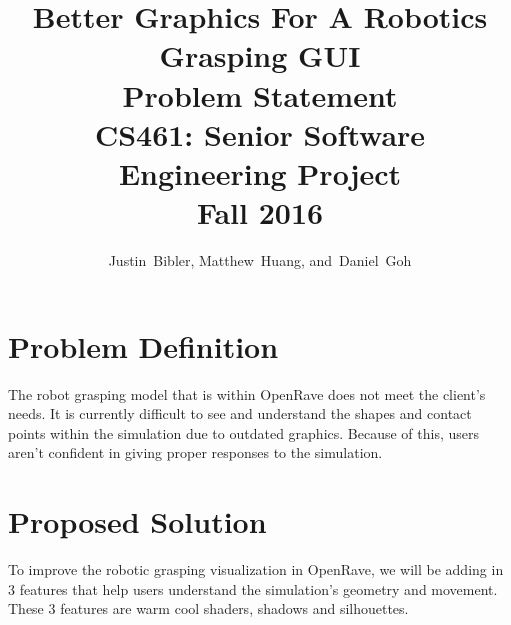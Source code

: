 \documentclass[10pt,journal,compsoc]{IEEEtran}
\begin{document}
\onecolumn
\begin{titlepage}
\title{Better Graphics For A Robotics Grasping GUI\\ Problem Statement \\  [0.5em] 
	\large CS461: Senior Software Engineering Project \\ Fall 2016}

\author{Justin~Bibler,
        Matthew~Huang,
        and~Daniel~Goh}
		

\maketitle

\end{titlepage}

\section{Problem Definition}
The robot grasping model that is within OpenRave does not meet the client’s needs.
It is currently difficult to see and understand the shapes and contact points within the simulation due to outdated graphics.
Because of this, users aren’t confident in giving proper responses to the simulation.

\section{Proposed Solution}
To improve the robotic grasping visualization in OpenRave, we will be adding in 3 features that help users understand the simulation’s geometry and movement. 
These 3 features are warm cool shaders, shadows and silhouettes. \par
\end{document}
